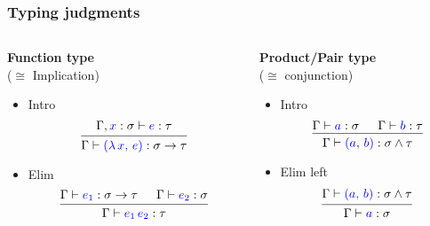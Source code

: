 \documentclass{beamer}
\begin{document}
\begin{frame}
  \frametitle{Typing judgments}

  \begin{columns}
    \begin{column}{.5\textwidth}
      \textbf{\quad Function type} \\ \quad ($\cong$ Implication)
      \minipage[c][0.6\textheight][s]{\columnwidth}
      \vspace{0.05\textheight}
      \begin{itemize}[label=$\ast$]
      \item Intro
        \[
        \begin{prooftree}
          \hypo{\Gamma, {\color{blue} x} : \sigma \vdash {\color{blue} e} : \tau}
          \infer1{\Gamma \vdash {\color{blue} (\lambda \, x, \, e)} : \sigma \rightarrow \tau}
        \end{prooftree}
        \]

      \item Elim
        \[
        \begin{prooftree}
          \hypo{\Gamma \vdash {\color{blue} e_1} : \sigma \rightarrow \tau}
          \hypo{\Gamma \vdash {\color{blue} e_2} : \sigma}
          \infer2{\Gamma \vdash {\color{blue} e_1 \, e_2} : \tau}
        \end{prooftree}
        \]
      \end{itemize}
      \endminipage
    \end{column}

    \begin{column}{.5\textwidth}
      \textbf{\quad Product/Pair type} \\ \quad ($\cong$ conjunction)
      \minipage[c][0.6\textheight][s]{\columnwidth}
      \vspace{0.05\textheight}
      \begin{itemize}[label=$\ast$]
      \item Intro
      \[
        \begin{prooftree}
          \hypo{\Gamma \vdash {\color{blue} a} : \sigma}
          \hypo{\Gamma \vdash {\color{blue} b} : \tau}
          \infer2{\Gamma \vdash {\color{blue} (a, \, b)} : \sigma \wedge
            \tau }
        \end{prooftree}
      \]

      \item Elim left
      \[
        \begin{prooftree}
          \hypo{\Gamma \vdash {\color{blue} (a, \, b)} : \sigma \wedge
            \tau}
          \infer1{\Gamma \vdash {\color{blue} a} : \sigma}
        \end{prooftree}
      \]


\end{itemize}
\end{column}
\end{columns}
\end{frame}
\end{document}
